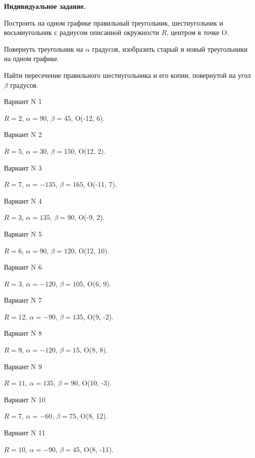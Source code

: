 \documentclass[11pt]{report}
\begin{document}
\pagestyle{empty}

{\bf Индивидуальное задание.}


Построить на одном графике правильный треугольник, шестиугольник и восьмиугольник с радиусом описанной окружности $R$, центром в точке O.



Повернуть треугольник на $\alpha$ градусов, изобразить старый и новый треугольники на одном графике.



Найти пересечение правильного шестиугольника и его копии, повернутой на угол $\beta$ градусов.


Вариант N 1

$R = 2$, $\alpha = 90$, $\beta = 45$, O(-12, 6).



Вариант N 2

$R = 5$, $\alpha = 30$, $\beta = 150$, O(12, 2).



Вариант N 3

$R = 7$, $\alpha = -135$, $\beta = 165$, O(-11, 7).



Вариант N 4

$R = 3$, $\alpha = 135$, $\beta = 90$, O(-9, 2).



Вариант N 5

$R = 6$, $\alpha = 90$, $\beta = 120$, O(12, 10).



Вариант N 6

$R = 3$, $\alpha = -120$, $\beta = 105$, O(6, 9).



Вариант N 7

$R = 12$, $\alpha = -90$, $\beta = 135$, O(9, -2).



Вариант N 8

$R = 9$, $\alpha = -120$, $\beta = 15$, O(8, 8).



Вариант N 9

$R = 11$, $\alpha = 135$, $\beta = 90$, O(10, -3).



Вариант N 10

$R = 7$, $\alpha = -60$, $\beta = 75$, O(8, 12).



Вариант N 11

$R = 10$, $\alpha = -90$, $\beta = 45$, O(8, -11).
\end{document}
